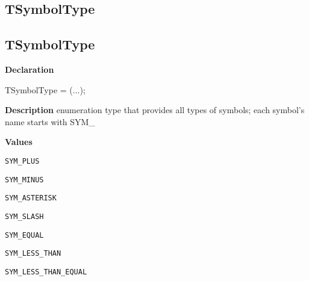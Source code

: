\documentclass{report}
\newif\ifpdf
\begin{document}
\subsection*{\large{\textbf{TSymbolType}}\normalsize\hspace{1ex}\hrulefill}
\else
\subsection*{TSymbolType}
\fi
\label{PasDoc_Tokenizer-TSymbolType}
\begin{list}{}{
\setlength{\itemindent}{0cm}
\setlength{\listparindent}{0cm}
\setlength{\leftmargin}{\evensidemargin}
\addtolength{\leftmargin}{\tmplength}
\settowidth{\labelsep}{X}
\addtolength{\leftmargin}{\labelsep}
\setlength{\labelwidth}{\tmplength}
}
\item[\textbf{Declaration}\hfill]
\ifpdf
\begin{flushleft}
\fi
\begin{ttfamily}
TSymbolType = (...);\end{ttfamily}

\ifpdf
\end{flushleft}
\fi

\par
\item[\textbf{Description}]
enumeration type that provides all types of symbols; each symbol's name starts with SYM{\_}\item[\textbf{Values}]
\begin{description}
\item[\texttt{SYM{\_}PLUS}] \label{PasDoc_Tokenizer-SYM_PLUS}
\index{}
 
\item[\texttt{SYM{\_}MINUS}] \label{PasDoc_Tokenizer-SYM_MINUS}
\index{}
 
\item[\texttt{SYM{\_}ASTERISK}] \label{PasDoc_Tokenizer-SYM_ASTERISK}
\index{}
 
\item[\texttt{SYM{\_}SLASH}] \label{PasDoc_Tokenizer-SYM_SLASH}
\index{}
 
\item[\texttt{SYM{\_}EQUAL}] \label{PasDoc_Tokenizer-SYM_EQUAL}
\index{}
 
\item[\texttt{SYM{\_}LESS{\_}THAN}] \label{PasDoc_Tokenizer-SYM_LESS_THAN}
\index{}
 
\item[\texttt{SYM{\_}LESS{\_}THAN{\_}EQUAL}] \label{PasDoc_Tokenizer-SYM_LESS_THAN_EQUAL}
\index{}
 

\end{description}
\end{list}
\end{document}
